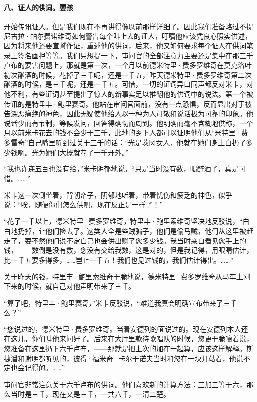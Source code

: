 \paragraph*{八、证人的供词。婴孩}
\par 开始传讯证人。但是我们现在不再讲得像以前那样详细了。因此我们准备略过不提尼古拉·帕尔费诺维奇如何警告每个叫上去的证人，叮嘱他应该凭良心照实供述，因为将来他还要宣誓作证，重述他的供词，后来，他又如何要求每个证人在供词笔录上签名画押等等。我们只想提一下，审问官的全部注意力主要还是集中在那三千卢布的要害问题上，那就是第一次，一个月以前德米特里·费多罗维奇在莫克洛叶初次酗酒的时候，花掉了三千呢，还是一千五，昨天德米特里·费多罗维奇第二次酗酒的时候，是三千呢，还是一千五。可惜，一切的证词异口同声都反对米卡，对他不利，有些证词甚至提出了惊人的新事实足以推翻他的供词中的说法。第一个被传讯的是特里丰·鲍里赛奇。他站在审问官面前，没有一点恐惧，反而显出对于被告深恶痛绝的神色，因此无疑使他给人以一种为人可敬和说话极为可靠的印象。他说话少而有节制，等候发问，回答得确切而周到。他明确而毫不含糊地供称，一个月以前米卡花去的钱不会少于三千，此地的乡下人都可以证明他们从“米特里·费多雷奇”自己嘴里听到过关于三千的话：“光是茨冈女人，他就在她们身上白扔了多少钱啊。光为她们大概就花了一千开外。”
\par “我也许连五百也没有给，”米卡阴郁地说，“只是当时没有数，喝醉酒了，真是可惜。……”
\par 米卡这一次侧坐着，背朝帘子，阴郁地听着，带着忧伤和疲乏的神色，似乎说：“唉，随便你们怎么供吧，现在反正是一样了！”
\par “花了一千以上，德米特里·费多罗维奇，”特里丰·鲍里索维奇坚决地反驳说，“白白地扔掉，让他们捡去了。这类人全是些贼骗子，他们是偷马贼，他们从这里被赶走了，要不然他们说不定自己也会供出赚了您多少钱。我当时亲自看见您手上的钱，——数倒是没有数，您没有交给我数，这是对的，但是我记得，用眼睛估计，比一千五要多得多，……岂止一千五！我们也见过钱的，我们估计得出。……”
\par 关于昨天的钱，特里丰·鲍里索维奇干脆地说，德米特里·费多罗维奇从马车上刚下来的时候，就自己对他声明带来了三千。
\par “算了吧，特里丰·鲍里赛奇，”米卡反驳说，“难道我真会明确宣布带来了三千么？”
\par “您说过的，德米特里·费多罗维奇。当着安德列的面说过的。现在安德列本人还在这儿，你们叫他来问好了。后来在大厅里款待歌唱队的时候，您更干脆嚷着说，您准备在这里扔下六千卢布，——那就是把上次的加在一起算，应该这样解释。斯捷潘和谢明都听见的，彼得·福米奇·卡尔干诺夫当时和您在一块儿站着，他说不定也会记得的。……”
\par 审问官非常注意关于六千卢布的供词。他们喜欢新的计算方法：三加三等于六，那么当时是三千，现在又是三千，一共六千，一清二楚。
